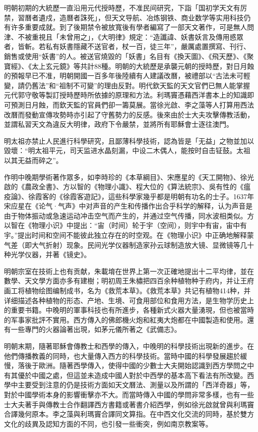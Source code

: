 明朝初期的大統歷一直沿用元代授時歷，不准民间研究，下詣「国初学天文有厉禁，習曆者遺戍，造曆者誅死」，但天文导航、冶炼钢铁、商业数学等实用科技仍有许多重要成就。到了後期禁令被放寬後有學者編寫了一部天文著作，可是無人問津、不被重視且「未曾用之」，《大明律》規定：“造讖諱、妖書妖言及傳用惑眾者，皆斬。若私有妖書隱藏不送官者，杖一百，徒三年”，嚴厲處置撰寫、刊行、銷售或使用“妖書”的人。被送官燒毀的「妖書」名目有《換天圖》、《飛天歷》、《聚寶經》、《太上玄元鏡》等共計88種。明朝的大統歷是承襲元朝的授時歷，對日月蝕的預報早已不准，明朝開國一百多年後陸續有人建議改曆，被禮部以“古法未可輕變，請仍舊法”和“祖制不可變”的理由反對。明代欽天監的天文官們已無人能掌握元代郭守敬等製訂授時歷時所依據的原理和方法。利瑪竇憑藉西洋書本上的知識即可預測日月蝕，而欽天監的官員們卻一籌莫展。當徐光啟、李之藻等人打算用西法改曆而發動宣傳攻勢時亦引起了守舊勢力的反感。後來由於士大夫攻擊傳教活動，並謂私習天文為違反大明律，政府下令嚴禁，並將所有耶穌會士逐往澳門。

明太祖亦禁止人民進行科學研究，且鄙薄科學技術，認為皆是「无益」之物並加以毀壞：“明太祖平元，司天监进水晶刻漏，中设二木偶人，能按时自击钲鼓。太祖以其无益而碎之”。

作明中晚期學術著作眾多，如李時珍的《本草綱目》、宋應星的《天工開物》、徐光啟的《農政全書》、方以智的《物理小識》、程大位的《算法統宗》、吳有性的《瘟疫論》、徐霞客的《徐霞客遊記》，這些科學家幾乎都是明朝有功名的士子。1637年宋应星在《论气·气声》中对声音的产生和传播作出合乎科学的解释，认为声音是由于物体振动或急速运动冲击空气而产生的，并通过空气传播，同水波相类似。方以智在《物理小识》中提出：“宙（时间）轮于宇（空间），则宇中有宙，宙中有宇。”提出时间和空间不能彼此独立存在的时空观。在《物理小识》中正确地解释蒙气差（即大气折射）现象。民间光学仪器制造家孙云球制造放大镜、显微镜等几十种光学仪器，并著《镜史》。

明朝宗室在技術上也有贡献，朱載堉在世界上第一次正確地提出十二平均律，並在數學、天文學方面亦多有建樹；明初周王朱橚把四百余种植物种于府内，并让王府画工将植物绘图编制成书，名为《救荒本草》。《救荒本草》共记有植物414种，并详细描述各种植物的形态、产地、生境、可食用部位和食用方法，是生物学历史上的重要书籍。中晚明的軍事科技也有所進步，各種新式火器大量湧現，但也被當時的军事家批評不實用。西方傳入的佛郎機火炮和紅夷大炮都在中國製造和使用。還有一些專門的火器論著出現，如茅元儀所著之《武備志》。

明朝末期，隨著耶穌會傳教士和西學的傳入，中晚明的科學技術出現新的進步。在他們傳播教義的同時，也大量傳入西方的科學技術。當時中國的科學發展趨於緩慢，落後于歐洲。隨著西學傳入，使得中國的少數士大夫開始認識到西方學問之中有其優於中國之處，但這並未造成中國人對於中西學的基本高下看法有所改變。西學中主要受到注意的仍是技術方面如天文曆法、測量以及所謂的「西洋奇器」等，對於中國學術本身的影響衝擊亦不大。而當時傳入中國的學問非常多樣，也有一些士大夫著手與傳教士合作翻譯西方書籍或著書介紹西學，例如徐光啟就曾與利瑪竇合譯幾何原本。李之藻與利瑪竇合譯同文算指。在中西文化交流的同時，基於雙方文化的歧異及認知方面的不同，也引發一些衝突，例如南京教案等。

